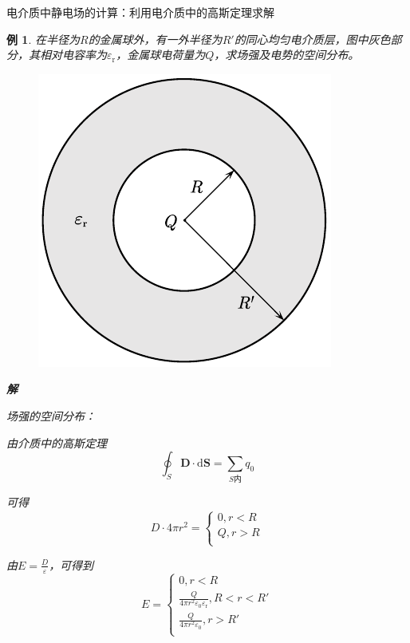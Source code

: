 \documentclass[12pt, a4paper, twoside]{ctexbook}
\newtheorem{example}[theorem]{例}
\begin{document}
{\sonti 电介质中静电场的计算}：利用电介质中的高斯定理求解
\begin{example}
    在半径为$R$的金属球外，有一外半径为$R'$的同心均匀电介质层，图中灰色部分，其相对电容率为$\varepsilon_{\mathrm{r}}$，金属球电荷量为$Q$，求场强及电势的空间分布。
    \begin{figure}[H]
        \centerline{\includegraphics[scale=1.0]{CH09EX06.pdf}}
    \end{figure}
    \noindent\textbf{解}

    {\sonti 场强的空间分布}：
    
    由介质中的高斯定理
    $$
    \oint_S \boldsymbol{D}\cdot\mathrm{d}\boldsymbol{S}=\sum_{S\text{内}}q_0
    $$
    
    可得
    $$
    D\cdot 4\pi r^2=\left\{ \begin{array}{l}
        0,r<R\\
        Q,r>R\\
    \end{array} \right. 
    $$
    
    由$E=\frac{D}{\varepsilon}$，可得到
    $$
    E=\left\{ \begin{array}{l}
        0,r<R\\
        \frac{Q}{4\pi r^2\varepsilon _0\varepsilon _{\mathrm{r}}},R<r<R'\\
        \frac{Q}{4\pi r^2\varepsilon _0},r>R'\\
    \end{array} \right. 
    $$
    

\end{example}
\end{document}
